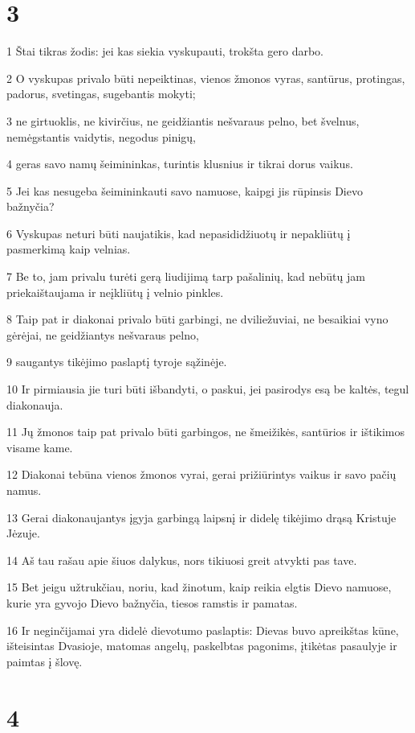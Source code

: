 \chapter{3}


\par 1 Štai tikras žodis: jei kas siekia vyskupauti, trokšta gero darbo. 
\par 2 O vyskupas privalo būti nepeiktinas, vienos žmonos vyras, santūrus, protingas, padorus, svetingas, sugebantis mokyti; 
\par 3 ne girtuoklis, ne kivirčius, ne geidžiantis nešvaraus pelno, bet švelnus, nemėgstantis vaidytis, negodus pinigų, 
\par 4 geras savo namų šeimininkas, turintis klusnius ir tikrai dorus vaikus. 
\par 5 Jei kas nesugeba šeimininkauti savo namuose, kaipgi jis rūpinsis Dievo bažnyčia? 
\par 6 Vyskupas neturi būti naujatikis, kad nepasididžiuotų ir nepakliūtų į pasmerkimą kaip velnias. 
\par 7 Be to, jam privalu turėti gerą liudijimą tarp pašalinių, kad nebūtų jam priekaištaujama ir neįkliūtų į velnio pinkles. 
\par 8 Taip pat ir diakonai privalo būti garbingi, ne dviliežuviai, ne besaikiai vyno gėrėjai, ne geidžiantys nešvaraus pelno, 
\par 9 saugantys tikėjimo paslaptį tyroje sąžinėje. 
\par 10 Ir pirmiausia jie turi būti išbandyti, o paskui, jei pasirodys esą be kaltės, tegul diakonauja. 
\par 11 Jų žmonos taip pat privalo būti garbingos, ne šmeižikės, santūrios ir ištikimos visame kame. 
\par 12 Diakonai tebūna vienos žmonos vyrai, gerai prižiūrintys vaikus ir savo pačių namus. 
\par 13 Gerai diakonaujantys įgyja garbingą laipsnį ir didelę tikėjimo drąsą Kristuje Jėzuje. 
\par 14 Aš tau rašau apie šiuos dalykus, nors tikiuosi greit atvykti pas tave. 
\par 15 Bet jeigu užtrukčiau, noriu, kad žinotum, kaip reikia elgtis Dievo namuose, kurie yra gyvojo Dievo bažnyčia, tiesos ramstis ir pamatas. 
\par 16 Ir neginčijamai yra didelė dievotumo paslaptis: Dievas buvo apreikštas kūne, išteisintas Dvasioje, matomas angelų, paskelbtas pagonims, įtikėtas pasaulyje ir paimtas į šlovę.


\chapter{4}


